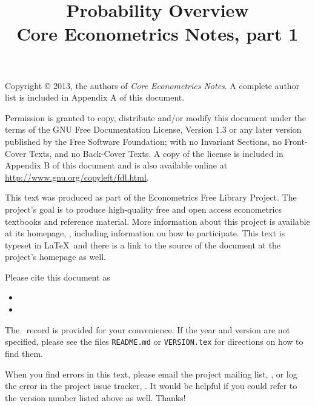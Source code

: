 \documentclass[nohyper]{tufte-handout}
\title[Probability overview]%
{Probability Overview \\
  Core Econometrics Notes, part 1}
\begin{document}
\maketitle

\bigskip\noindent%
Copyright © 2013, the authors of \textit{Core Econometrics Notes}.
A complete author list is included in Appendix A of this document.

Permission is granted to copy, distribute and/or modify this document
under the terms of the GNU Free Documentation License, Version 1.3 or
any later version published by the Free Software Foundation; with no
Invariant Sections, no Front-Cover Texts, and no Back-Cover Texts.  A
copy of the license is included in Appendix B of this document and is
also available online at \url{http://www.gnu.org/copyleft/fdl.html}.

This text was produced as part of the Econometrics Free Library
Project.  The project's goal is to produce high-quality free and
open access econometrics textbooks and reference material.  More
information about this project is available at its homepage,
\homepage, including information on how
to participate.  This text is typeset in \LaTeX\ and there is a link
to the source of the document at the project's homepage as well.

Please cite this document as
\begin{itemize}
\item[] 
\item[] 
\end{itemize}
The \BibTeX\ record is provided for your convenience.
If the year and version are not specified, please see the files
\texttt{README.md} or \texttt{VERSION.tex} for directions on how to
find them.

When you find errors in this text, please email the project mailing
list, \maillist, or log the error in the project issue tracker,
\bugtrack.  It would be helpful if you could refer to the version
number listed above as well.  Thanks!

\tableofcontents
\listoftables
\listoffigures






\end{document}
